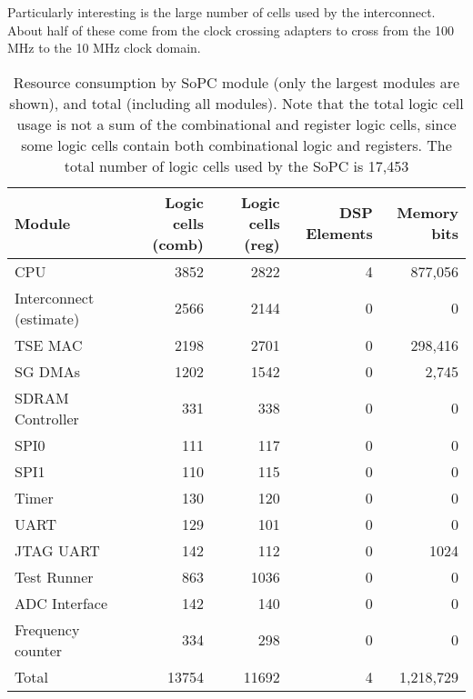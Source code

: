 Particularly interesting is the large number of cells used by the interconnect. About half of these
come from the clock crossing adapters to cross from the 100 MHz to the 10 MHz clock domain.

\begin{table}[h!]
\centering
\begin{tabular}{ | p{2cm} | r | r | r | r | }
 \hline
   Module       & Logic cells (comb) & Logic cells (reg) & DSP Elements & Memory bits \\
 \hline
   CPU & 3852 & 2822 & 4 & 877,056 \\
 \hline
   Interconnect (estimate) & 2566 & 2144 & 0 & 0\\
 \hline
   TSE MAC & 2198 & 2701 & 0 & 298,416 \\
 \hline
   SG DMAs & 1202 & 1542 & 0 & 2,745 \\
 \hline
   SDRAM Controller & 331 & 338 & 0 & 0 \\
 \hline
   SPI0 & 111 & 117 & 0 & 0 \\
 \hline
   SPI1 & 110 & 115 & 0 & 0 \\
\hline
   Timer & 130 & 120 & 0 & 0 \\
\hline
   UART & 129 & 101 & 0 & 0 \\
\hline
   JTAG UART & 142 & 112 & 0 & 1024 \\
\hline
   Test Runner & 863 & 1036 & 0 & 0 \\
\hline
   ADC Interface & 142 & 140 & 0 & 0 \\
 \hline
   Frequency counter & 334 & 298 & 0 & 0 \\
 \hline
 \hline
   Total & 13754 & 11692 & 4 & 1,218,729 \\
 \hline
\end{tabular}
\caption{Resource consumption by SoPC module (only the largest modules are shown), and total (including all modules). Note that the total logic cell usage is not a sum of the combinational and register logic cells, since some logic cells contain both combinational logic and registers. The total number of logic cells used by the SoPC is 17,453}
\label{table:linuxsys_resusage}
\end{table}
